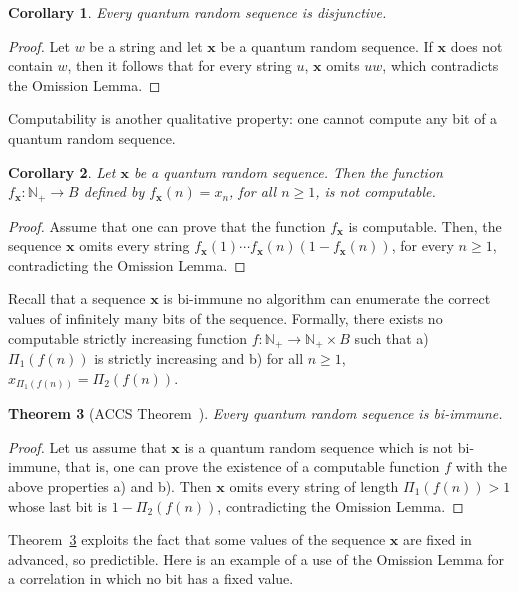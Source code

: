 \documentclass[%
 preprint,
 showpacs,
 showkeys,
 preprintnumbers,
  amsmath,amssymb,
  aps,
 pra,
  longbibliography,
  floatfix,
 ]{revtex4-1}
\theoremstyle{plain}
\newtheorem{theorem}{Theorem}[section]
\newtheorem{corollary}[theorem]{Corollary}
\newcommand{\N}{\mathbb{N}}%
\newcommand{\x}{\mathbf{x}}
\newcommand{\ar}{\rightarrow}
\begin{document}
\begin{corollary}\label{cor:allstrings}
Every quantum random sequence  is disjunctive.
\end{corollary}
\begin{proof}
Let $w$ be a string and let $\x$ be a quantum random sequence. If $\x$ does not contain $w$, then it follows that for every string $u$, $\x$ omits $uw$, which contradicts the Omission Lemma.
\end{proof}

Computability is another qualitative property: one cannot compute any bit of a quantum random sequence.

 \begin{corollary}
 \label{cor:notbitcomput}
Let $\x$ be a quantum random sequence. Then the function $f_{\x}: \N_{+} \ar B$  defined by  $f_{\x}(n)=x_{n}$, for all $n\ge 1$, is not computable.

\end{corollary}
\begin{proof}Assume that one can prove that the function $f_{\x}$ is computable.  Then, the sequence $\x$
omits every string $f_{\x}(1) \cdots f_{\x}(n)(1-f_{\x}(n))$, for every $n\ge 1$, contradicting  the Omission Lemma.
\end{proof}

Recall that a sequence $\x$ is bi-immune no algorithm can enumerate the correct values of infinitely many bits of the sequence. Formally,
there exists no computable strictly increasing function $f: \N_{+} \ar \N_{+} \times B$ such that a) $\Pi_{1}(f(n))$ is strictly increasing and b)
for all $n \ge 1$,
$x_{\Pi_{1}(f(n))}=\Pi_{2}(f(n))$.

\begin{theorem}[ACCS Theorem~\cite{ACCS}]
\label{thm:biimmunitybyomision}
Every quantum random sequence is bi-immune.
\end{theorem}

\begin{proof}
Let us assume that $\x$ is a quantum random sequence which is not bi-immune, that is, one can prove the existence of a computable  function $f$ with the above properties a) and b). Then $\x$  omits every string  of length $\Pi_{1}(f(n))>1$ whose last bit is $1-\Pi_{2}(f(n))$, contradicting  the Omission Lemma.
\end{proof}


Theorem~\ref{thm:biimmunitybyomision} exploits the fact that some values of the sequence $\x$ are fixed in advanced, so predictible. Here is an example of a
use of the Omission Lemma for a correlation in which no bit has a fixed value.
\end{document}
